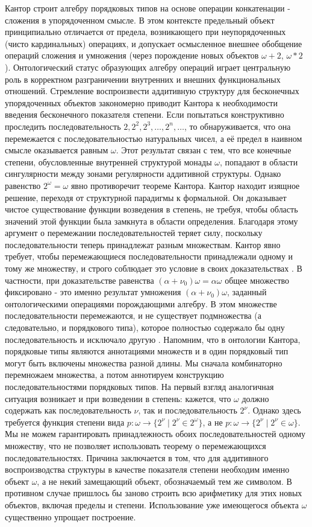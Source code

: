 \documentclass[12pt]{article}
\begin{document}
Кантор строит алгебру порядковых типов на основе операции конкатенации - сложения в упорядоченном смысле. В этом контексте предельный объект принципиально отличается от предела, возникающего при неупорядоченных (чисто кардинальных) операциях, и допускает осмысленное внешнее обобщение операций сложения и умножения (через порождение новых объектов $\omega + 2$, $\omega*2$). Онтологический статус образующих алгебру операций играет центральную роль в корректном разграничении внутренних и внешних функциональных отношений. Стремление воспроизвести аддитивную структуру для бесконечных упорядоченных объектов закономерно приводит Кантора к необходимости введения бесконечного показателя степени. Если попытаться конструктивно проследить последовательность $2, 2^2, 2^3, \dots, 2^n, \dots$, то обнаруживается, что она перемежается с последовательностью натуральных чисел, а её предел в наивном смысле оказывается равным $\omega$. Этот результат связан с тем, что все конечные степени, обусловленные внутренней структурой монады $\omega$, попадают в области сингулярности между зонами регулярности аддитивной структуры. Однако равенство $2^\omega = \omega$ явно противоречит теореме Кантора. Кантор находит изящное решение, переходя от структурной парадигмы к формальной. Он доказывает чистое существование функции возведения в степень, не требуя, чтобы область значений этой функции была замкнута в области определения. Благодаря этому аргумент о перемежании последовательностей теряет силу, поскольку последовательности теперь принадлежат разным множествам. Кантор явно требует, чтобы перемежающиеся последовательности принадлежали одному и тому же множеству, и строго соблюдает это условие в своих доказательствах \cite{cantor-alternate}. В частности, при доказательстве равенства $(\alpha + \nu_0)\omega = \alpha \omega$ общее множество фиксировано - это именно результат умножения $(\alpha + \nu_0)\omega$, заданный онтологическими операциями порождающими алгебру. В этом множестве последовательности перемежаются, и не существует подмножества (а следовательно, и порядкового типа), которое полностью содержало бы одну последовательность и исключало другую \cite{cantor-outer-multiply}. Напомним, что в онтологии Кантора, порядковые типы являются аннотациями множеств и в один порядковый тип могут быть включены множества разной длины. Мы сначала комбинаторно перемножаем множества, а потом аннотируем конструкцию последовательностями порядковых типов. На первый взгляд аналогичная ситуация возникает и при возведении в степень: кажется, что $\omega$ должно содержать как последовательность $\nu$, так и последовательность $2^\nu$. Однако здесь требуется функция степени вида $p : \omega \to \{2^\nu \mid 2^\nu \in 2^\omega\}$, а не $p : \omega \to \{2^\nu \mid 2^\nu \in \omega\}$. Мы не можем гарантировать принадлежность обоих последовательностей одному множеству, что не позволяет использовать теорему о перемежающихся последовательностях. Причина заключается в том, что для аддитивного воспроизводства структуры в качестве показателя степени необходим именно объект $\omega$, а не некий замещающий объект, обозначаемый тем же символом. В противном случае пришлось бы заново строить всю арифметику для этих новых объектов, включая пределы и степени. Использование уже имеющегося объекта $\omega$ существенно упрощает построение. 
\end{document}
